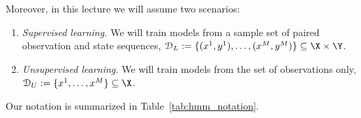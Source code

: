 Moreover, in this lecture we will assume two scenarios:
\begin{enumerate}
\item \emph{Supervised learning.} We will 
train models from a sample set of paired observation and state sequences, $\mathcal{D}_L := \{(x^1,y^1), \ldots, (x^M,y^M)\} \subseteq \X \times \Y$.
\item \emph{Unsupervised learning.} We will
train models from the set of observations only, $\mathcal{D}_U := \{x^1, \ldots, x^M\} \subseteq \X$.
\end{enumerate}
Our notation is summarized in Table~\ref{tab:hmm_notation}.

%

